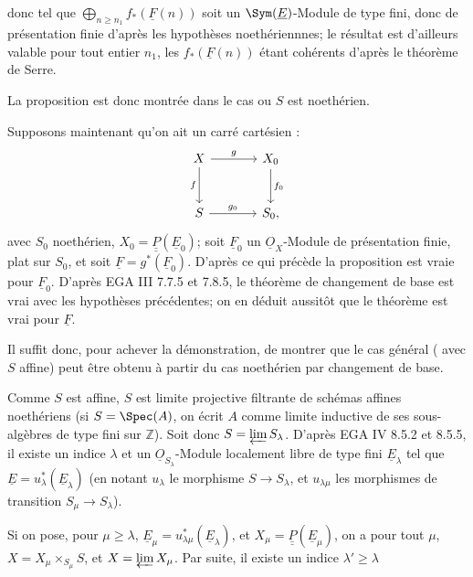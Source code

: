
donc tel que \(\bigoplus_{n\geq n_1} f_*(\underline{F}(n))\) soit un \(\Sym(\underline{E})\)-Module de type fini, donc de présentation finie d'après les hypothèses noethériennnes; le résultat est d'ailleurs valable pour tout entier \(n_1\), les \(f_*(\underline{F}(n))\) étant cohérents d'après le théorème de Serre.

La proposition est donc montrée dans le cas ou \(S\) est noethérien.

Supposons maintenant qu'on ait un carré cartésien :
\[
\begin{tikzcd}[column sep=large,row sep=large]
X \arrow[r,"g"] \arrow[d,"f"'] & X_0 \arrow[d,"f_0"]\\
S \arrow[r,"g_0"] & S_0,
\end{tikzcd}
\]
avec \(S_0\) noethérien, \(X_0=\underline{\underline{P}}(\underline{E}_0)\); soit \(\underline{F}_0\) un \(\underline{O}_X\)-Module de présentation finie, plat sur \(S_0\), et soit \(\underline{F}=g^*(\underline{F}_0)\). D'après ce qui précède la proposition est vraie pour \(\underline{F}_0\). D'après EGA III 7.7.5 et 7.8.5, le théorème de changement de base est vrai avec les hypothèses précédentes; on en déduit aussitôt que le théorème est vrai pour \(\underline{F}\).

Il suffit donc, pour achever la démonstration, de montrer que le cas général ( avec \(S\) affine) peut être obtenu à partir du cas noethérien par changement de base.

Comme \(S\) est affine, \(S\) est limite projective filtrante de schémas affines noethériens (si \(S=\Spec(A)\), on écrit \(A\) comme limite inductive de ses sous-algèbres de type fini sur \(\mathbb Z\)). Soit donc \(S=\varprojlim S_\lambda\). D'après EGA IV 8.5.2 et 8.5.5, il existe un indice \(\lambda\) et un \(\underline{O}_{S_\lambda}\)-Module localement libre de type fini \(\underline{E}_\lambda\) tel que \(\underline{E}=u_\lambda^*(\underline{E}_\lambda)\) (en notant \(u_\lambda\) le morphisme \(S\to S_\lambda\), et \(u_{\lambda\mu}\) les morphismes de transition \(S_\mu\to S_\lambda\)).

Si on pose, pour \(\mu\geq\lambda\), \(\underline{E}_\mu=u_{\lambda\mu}^*(\underline{E}_\lambda)\), et \(X_\mu=\underline{\underline{P}}(\underline{E}_\mu)\), on a pour tout \(\mu\), \(X=X_\mu\times_{S_\mu}S\), et \(X=\varprojlim X_\mu\). Par suite, il existe un indice \(\lambda'\geq\lambda\)
